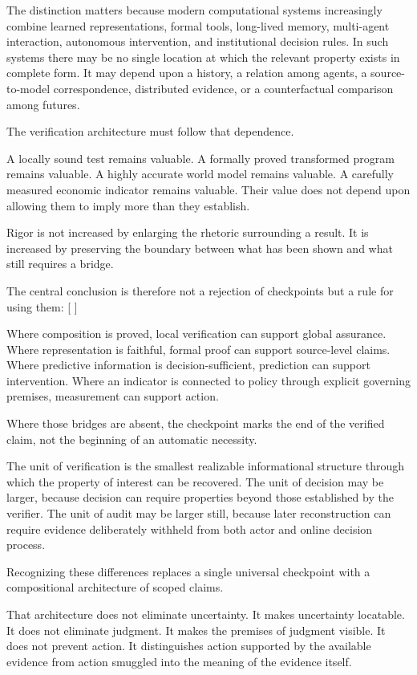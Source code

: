 \documentclass[11pt]{article}
\begin{document}
The distinction matters because modern computational systems increasingly combine learned representations, formal tools, long-lived memory, multi-agent interaction, autonomous intervention, and institutional decision rules. In such systems there may be no single location at which the relevant property exists in complete form. It may depend upon a history, a relation among agents, a source-to-model correspondence, distributed evidence, or a counterfactual comparison among futures.

The verification architecture must follow that dependence.

A locally sound test remains valuable. A formally proved transformed program remains valuable. A highly accurate world model remains valuable. A carefully measured economic indicator remains valuable. Their value does not depend upon allowing them to imply more than they establish.

Rigor is not increased by enlarging the rhetoric surrounding a result. It is increased by preserving the boundary between what has been shown and what still requires a bridge.

The central conclusion is therefore not a rejection of checkpoints but a rule for using them:
[
]

Where composition is proved, local verification can support global assurance. Where representation is faithful, formal proof can support source-level claims. Where predictive information is decision-sufficient, prediction can support intervention. Where an indicator is connected to policy through explicit governing premises, measurement can support action.

Where those bridges are absent, the checkpoint marks the end of the verified claim, not the beginning of an automatic necessity.

The unit of verification is the smallest realizable informational structure through which the property of interest can be recovered. The unit of decision may be larger, because decision can require properties beyond those established by the verifier. The unit of audit may be larger still, because later reconstruction can require evidence deliberately withheld from both actor and online decision process.

Recognizing these differences replaces a single universal checkpoint with a compositional architecture of scoped claims.

That architecture does not eliminate uncertainty. It makes uncertainty locatable. It does not eliminate judgment. It makes the premises of judgment visible. It does not prevent action. It distinguishes action supported by the available evidence from action smuggled into the meaning of the evidence itself.
\end{document}
